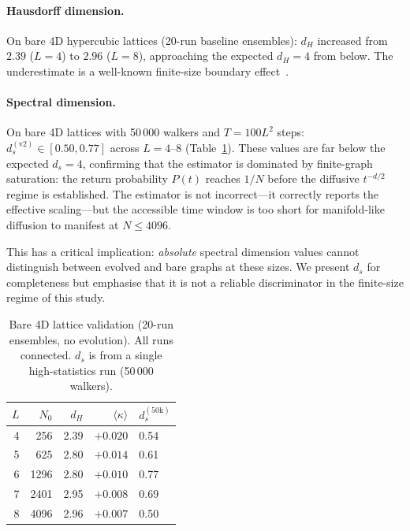 \documentclass[aps,prd,twocolumn,superscriptaddress,floatfix]{revtex4-2}
\begin{document}
\paragraph{Hausdorff dimension.}
On bare 4D hypercubic lattices (20-run baseline ensembles):
$d_H$ increased from $2.39$ ($L\!=\!4$) to $2.96$ ($L\!=\!8$),
approaching the expected $d_H = 4$ from below.  The underestimate
is a well-known finite-size boundary effect~\cite{Ambjorn2005}.

\paragraph{Spectral dimension.}
On bare 4D lattices with 50\,000 walkers and $T = 100 L^2$
steps: $d_s^{(\mathrm{v2})} \in [0.50, 0.77]$ across
$L = 4$--$8$ (Table~\ref{tab:baseline}).  These values are far
below the expected $d_s = 4$, confirming that the estimator is
dominated by finite-graph saturation: the return probability
$P(t)$ reaches $1/N$ before the diffusive $t^{-d/2}$ regime is
established.  The estimator is not incorrect---it correctly
reports the effective scaling---but the accessible time window
is too short for manifold-like diffusion to manifest at
$N \le 4096$.

This has a critical implication: \emph{absolute} spectral
dimension values cannot distinguish between evolved and bare
graphs at these sizes.  We present $d_s$ for completeness but
emphasise that it is not a reliable discriminator in the
finite-size regime of this study.

\begin{table}[htbp]
  \centering
  \caption{Bare 4D lattice validation (20-run ensembles, no
    evolution).  All runs connected.  $d_s$ is from a single
    high-statistics run (50\,000 walkers).}
  \label{tab:baseline}
  \begin{tabular}{rrrrl}
    \toprule
    $L$ & $N_0$ & $d_H$ & $\langle\kappa\rangle$ &
      $d_s^{(50\mathrm{k})}$ \\
    \midrule
    4 & 256  & 2.39 & $+0.020$ & 0.54 \\
    5 & 625  & 2.80 & $+0.014$ & 0.61 \\
    6 & 1296 & 2.80 & $+0.010$ & 0.77 \\
    7 & 2401 & 2.95 & $+0.008$ & 0.69 \\
    8 & 4096 & 2.96 & $+0.007$ & 0.50 \\
    \bottomrule
  \end{tabular}
\end{table}
\end{document}
